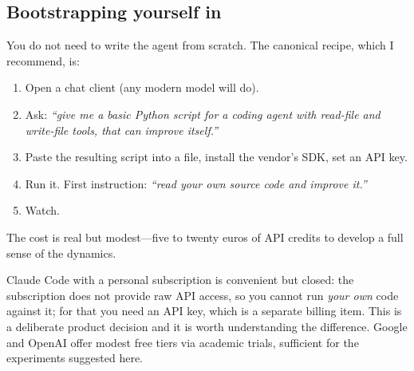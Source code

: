 \subsection{Bootstrapping yourself in}

You do not need to write the agent from scratch.  The
canonical recipe, which I recommend, is:

\begin{enumerate}[(1)]
  \item Open a chat client (any modern model will do).
  \item Ask: \emph{``give me a basic Python script for a coding
    agent with read-file and write-file tools, that can improve
    itself.''}
  \item Paste the resulting script into a file, install the
    vendor's SDK, set an API key.
  \item Run it.  First instruction: \emph{``read your own source
    code and improve it.''}
  \item Watch.
\end{enumerate}

The cost is real but modest---five to twenty euros of API
credits to develop a full sense of the dynamics.

\begin{remark}
  Claude Code with a personal subscription is convenient but
  closed: the subscription does not provide raw API access, so
  you cannot run \emph{your own} code against it; for that you
  need an API key, which is a separate billing item.  This is
  a deliberate product decision and it is worth understanding
  the difference.  Google and OpenAI offer modest free tiers via
  academic trials, sufficient for the experiments suggested
  here.
\end{remark}
